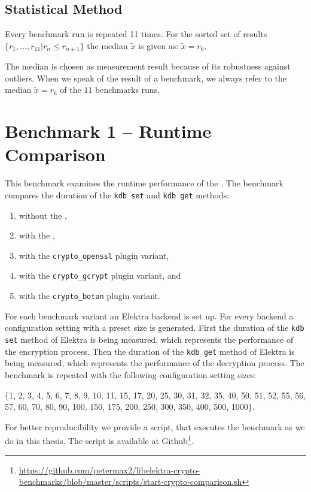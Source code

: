   \subsection{Statistical Method}

Every benchmark run is repeated 11 times.
For the sorted set of results $\{r_{1},...,r_{11} | r_n \leq r_{n+1}\}$ the median $\tilde{x}$ is given as: $\tilde{x}=r_6$.

The median is chosen as measurement result because of its robustness against outliers.
When we speak of the result of a benchmark, we always refer to the median $\tilde{x}=r_6$ of the $11$ benchmarks runs.

\section{Benchmark 1 -- Runtime Comparison}
\label{eval-bench-one}

This benchmark examines the runtime performance of the \crypto{}.
The benchmark compares the duration of the \texttt{kdb set} and \texttt{kdb get} methods:

\begin{enumerate}
\item without the \crypto ,
\item with the \fcrypt ,
\item with the \texttt{crypto\_openssl} plugin variant,
\item with the \texttt{crypto\_gcrypt} plugin variant, and 
\item with the \texttt{crypto\_botan} plugin variant.
\end{enumerate}

For each benchmark variant an Elektra backend is set up.
For every backend a configuration setting with a preset size is generated.
First the duration of the \texttt{kdb set} method of Elektra is being measured, which represents the performance of the encryption process.
Then the duration of the \texttt{kdb get} method of Elektra is being measured, which represents the performance of the decryption process.
The benchmark is repeated with the following configuration setting sizes: 

$\{$1, 2, 3, 4, 5, 6, 7, 8, 9, 10, 11, 15, 17, 20, 25, 30, 31, 32, 35, 40, 50, 51, 52, 55, 56, 57, 60, 70, 80, 90, 100, 150, 175, 200, 250, 300, 350, 400, 500, 1000$\}$.

For better reproducibility we provide a script, that executes the benchmark as we do in this thesis.
The script is available at Github\footnote{\url{https://github.com/petermax2/libelektra-crypto-benchmarks/blob/master/scripts/start-crypto-comparison.sh}}.

